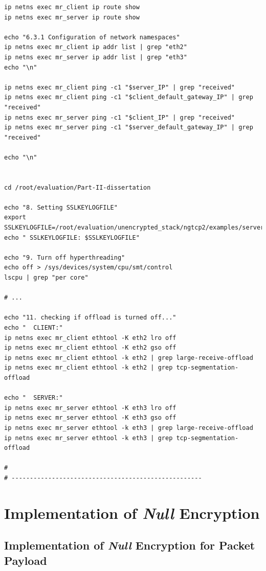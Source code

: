 \documentclass[12pt,a4paper]{report}
\begin{document}
\begin{verbatim}
ip netns exec mr_client ip route show
ip netns exec mr_server ip route show

echo "6.3.1 Configuration of network namespaces"
ip netns exec mr_client ip addr list | grep "eth2"
ip netns exec mr_server ip addr list | grep "eth3"
echo "\n"

ip netns exec mr_client ping -c1 "$server_IP" | grep "received"
ip netns exec mr_client ping -c1 "$client_default_gateway_IP" | grep "received"
ip netns exec mr_server ping -c1 "$client_IP" | grep "received"
ip netns exec mr_server ping -c1 "$server_default_gateway_IP" | grep "received"

echo "\n"


cd /root/evaluation/Part-II-dissertation

echo "8. Setting SSLKEYLOGFILE"
export SSLKEYLOGFILE=/root/evaluation/unencrypted_stack/ngtcp2/examples/server.key
echo " SSLKEYLOGFILE: $SSLKEYLOGFILE"

echo "9. Turn off hyperthreading"
echo off > /sys/devices/system/cpu/smt/control
lscpu | grep "per core"

# ...

echo "11. checking if offload is turned off..."
echo "  CLIENT:"
ip netns exec mr_client ethtool -K eth2 lro off
ip netns exec mr_client ethtool -K eth2 gso off
ip netns exec mr_client ethtool -k eth2 | grep large-receive-offload
ip netns exec mr_client ethtool -k eth2 | grep tcp-segmentation-offload

echo "  SERVER:"
ip netns exec mr_server ethtool -K eth3 lro off
ip netns exec mr_server ethtool -K eth3 gso off
ip netns exec mr_server ethtool -k eth3 | grep large-receive-offload
ip netns exec mr_server ethtool -k eth3 | grep tcp-segmentation-offload

#
# ----------------------------------------------------

\end{verbatim}

\chapter{Implementation of \textit{Null} Encryption} 

\section{Implementation of \textit{Null} Encryption for Packet Payload}
\label{Implementation_of_Null_Encryption_packet_payload}
\end{document}

